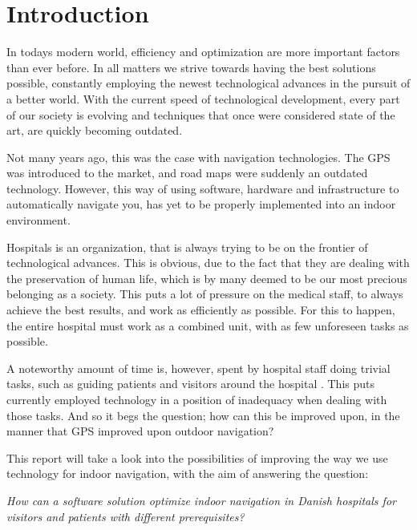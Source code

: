 \chapter{Introduction}\label{intro}

In todays modern world, efficiency and optimization are more important factors than ever before. In all matters we strive towards having the best solutions possible, constantly employing the newest technological advances in the pursuit of a better world. With the current speed of technological development, every part of our society is evolving and techniques that once were considered state of the art, are quickly becoming outdated.

Not many years ago, this was the case with navigation technologies. The GPS was introduced to the market, and road maps were suddenly an outdated technology. However, this way of using software, hardware and infrastructure to automatically navigate you, has yet to be properly implemented into an indoor environment.

Hospitals is an organization, that is always trying to be on the frontier of technological advances. This is obvious, due to the fact that they are dealing with the preservation of human life, which is by many deemed to be our most precious belonging as a society. This puts a lot of pressure on the medical staff, to always achieve the best results, and work as efficiently as possible. For this to happen, the entire hospital must work as a combined unit, with as few unforeseen tasks as possible.

A noteworthy amount of time is, however, spent by hospital staff doing trivial tasks, such as guiding patients and visitors around the hospital \cite{findvejintro,timewaste}. This puts currently employed technology in a position of inadequacy when dealing with those tasks. And so it begs the question; how can this be improved upon, in the manner that GPS improved upon outdoor navigation?

This report will take a look into the possibilities of improving the way we use technology for indoor navigation, with the aim of answering the question:

\textit{How can a software solution optimize indoor navigation in Danish hospitals for visitors and patients with different prerequisites?}\label{sub:init}



